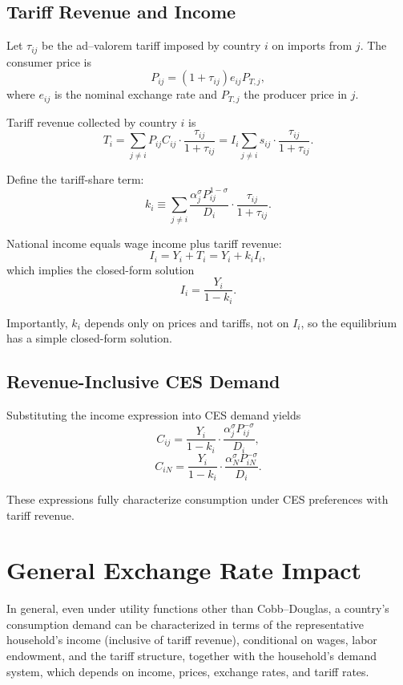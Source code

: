\documentclass[11pt]{article}
\begin{document}
\subsection*{Tariff Revenue and Income}

Let $\tau_{ij}$ be the ad–valorem tariff imposed by country $i$ on imports from $j$.
The consumer price is 
\[
P_{ij} = (1+\tau_{ij}) e_{ij} P_{T,j},
\]
where $e_{ij}$ is the nominal exchange rate and $P_{T,j}$ the producer price in $j$.

Tariff revenue collected by country $i$ is
\[
T_i  
= 
\sum_{j \neq i}
    P_{ij} C_{ij}
    \cdot
    \frac{\tau_{ij}}{1+\tau_{ij}}
=
I_i 
\sum_{j \neq i}
    s_{ij}
    \cdot 
    \frac{\tau_{ij}}{1+\tau_{ij}}.
\]

Define the tariff-share term:
\[
k_i 
\equiv 
\sum_{j \neq i}
\frac{\alpha_j^\sigma P_{ij}^{1-\sigma}}{D_i}
\cdot 
\frac{\tau_{ij}}{1+\tau_{ij}}.
\]

National income equals wage income plus tariff revenue:
\[
I_i = Y_i + T_i = Y_i + k_i I_i,
\]
which implies the closed-form solution
\[
I_i = \frac{Y_i}{1 - k_i}.
\]

Importantly, $k_i$ depends only on prices and tariffs, not on $I_i$, so the equilibrium has a simple closed-form solution.

\subsection*{Revenue-Inclusive CES Demand}

Substituting the income expression into CES demand yields
\[
C_{ij}
=
\frac{Y_i}{1-k_i}
\cdot
\frac{\alpha_j^\sigma P_{ij}^{-\sigma}}{D_i},
\]
\[
C_{iN}
=
\frac{Y_i}{1-k_i}
\cdot
\frac{\alpha_N^\sigma P_{iN}^{-\sigma}}{D_i}.
\]

These expressions fully characterize consumption under CES preferences with tariff revenue.


\section*{General Exchange Rate Impact}

In general, even under utility functions other than Cobb--Douglas, a country’s 
consumption demand can be characterized in terms of the representative 
household’s income (inclusive of tariff revenue), conditional on wages, labor 
endowment, and the tariff structure, together with the household’s demand 
system, which depends on income, prices, exchange rates, and tariff rates.
\end{document}
